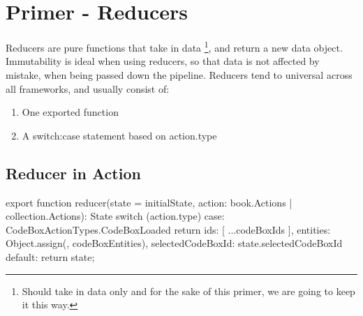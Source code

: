 \maketitle{}
\section{ Primer - Reducers }
Reducers are pure functions that take in data \footnote{Should take in data only
and for the sake of this primer, we are going to keep it this way.}, and return
a new data object. Immutability is ideal when using reducers, so that data is
not affected by mistake, when being passed down the pipeline. Reducers tend to
universal across all frameworks, and usually consist of:
\begin{enumerate}
  \item One exported function
  \item A switch:case statement based on action.type
\end{enumerate}

\subsection{ Reducer in Action }
export function reducer(state = initialState, action: book.Actions
| collection.Actions): State {
  switch (action.type) {
    case: CodeBoxActionTypes.CodeBoxLoaded {
      return {
        ids: [ ...codeBoxIds ],
        entities: Object.assign({}, codeBoxEntities),
        selectedCodeBoxId: state.selectedCodeBoxId
      }
    }
    default: {
      return state;
    }
  }
}

